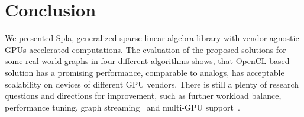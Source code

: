 \section{Conclusion}

We presented Spla, generalized sparse linear algebra library with vendor-agnostic GPUs accelerated computations. The evaluation of the proposed solutions for some real-world graphs in four different algorithms shows, that OpenCL-based solution has a promising performance, comparable to analogs, has acceptable scalability on devices of different GPU vendors. There is still a plenty of research questions and directions for improvement, such as further workload balance, performance tuning, graph streaming~\cite{10.1145/2600212.2600227} and multi-GPU support~\cite{7967137}.

